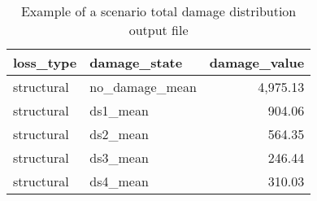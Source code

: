 \begin{table}[htbp]
\centering
\begin{tabular}{llr}
\hline
\rowcolor{lightgray}
\textbf{loss\_type} & \textbf{damage\_state} & \textbf{damage\_value} \\ \hline
structural & no\_damage\_mean & 4,975.13 \\
structural & ds1\_mean & 904.06 \\
structural & ds2\_mean & 564.35 \\
structural & ds3\_mean & 246.44 \\
structural & ds4\_mean & 310.03 \\
\hline
\end{tabular}
\caption{Example of a scenario total damage distribution output file}
\label{output:scenario_damage_total}
\end{table}

